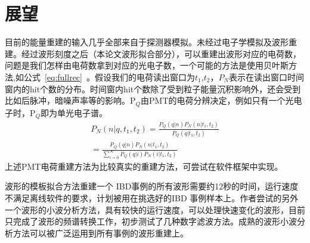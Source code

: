 \section{展望}

目前的能量重建的输入几乎全部来自于探测器模拟。未经过电子学模拟及波形重建。经过波形刻度之后（本论文波形拟合部分），可以重建出波形对应的电荷数，问题是我们怎样由电荷数拿到对应的光电子数，一个可能的方法是使用贝叶斯方法,如公式~\ref{eq:fullrec}~。假设我们的电荷读出窗口为$t_1$,$t_2$，$P_N$表示在读出窗口时间窗内的hit个数的分布。时间窗内hit个数除了受到粒子能量沉积影响外，还会受到比如后脉冲，暗噪声率等的影响。P$_Q$由PMT的电荷分辨决定，例如只有一个光电子时，P$_Q$即为单光电子谱。
\begin{eqnarray}\label{eq:fullrec}
P_{N}(n|q,t_1,t_2)=\frac{P_Q(q|n)P_N(n|t_1,t_2)}{P_Q(q|t_1,t_2)}\\
=\frac{P_Q(q|n)P_N(n|t_1,t_2)}{\sum_{i=0}^{\infty}P_Q(q|i)P_N(i|t_1,t_2)}   \nonumber
\end{eqnarray}
上述PMT电荷重建方法为比较真实的重建方法，可尝试在软件框架中实现。

波形的模板拟合方法重建一个 IBD事例的所有波形需要约12秒的时间，运行速度不满足离线软件的要求，计划被用在挑选好的IBD 事例样本上。作者尝试的另外一个波形的小波分析方法，具有较快的运行速度，可以处理快速变化的波形，目前只完成了波形的频谱转换工作，初步测试了几种数字滤波方法。成熟的波形小波分析方法可以被广泛运用到所有事例的波形重建上。

